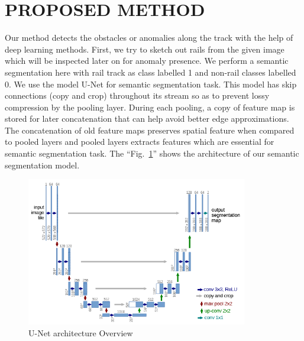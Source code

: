 \documentclass[conference]{IEEEtran}
\begin{document}
\section{PROPOSED METHOD}\label{proposed_method}
Our method detects the obstacles or anomalies along the track with the help of deep learning methods. First, we try to sketch out rails from the given image which will be inspected later on for anomaly presence. We perform a semantic segmentation here with rail track as class labelled 1 and non-rail classes labelled 0. We use the model U-Net \cite{ronneberger2015unet} for semantic segmentation task. This model has skip connections (copy and crop) throughout its stream so as to prevent lossy compression by the pooling layer. During each pooling, a copy of feature map is stored for later concatenation that can help avoid better edge approximations. The concatenation of old feature maps preserves spatial feature when compared to pooled layers and pooled layers extracts features which are essential for semantic segmentation task. The ``Fig.~\ref{U-Net}'' shows the architecture of our semantic segmentation model.
\begin{figure}[htbp]
\centerline{\includegraphics[height=6.5cm]{U-Net_model.png}}
\caption{U-Net architecture Overview}
\label{U-Net}
\end{figure} 
\end{document}
